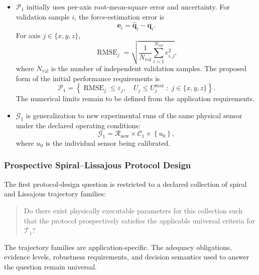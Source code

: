 \documentclass[11pt,a4paper]{article}
\begin{document}
\begin{itemize}
    \item $\mathcal{P}_1$ initially uses per-axis root-mean-square error and
    uncertainty. For validation sample $i$, the force-estimation error is
    \begin{equation}
        \mathbf{e}_i
        =
        \widehat{\mathbf{q}}_i-\mathbf{q}_i.
    \end{equation}
    For axis $j\in\{x,y,z\}$,
    \begin{equation}
        \operatorname{RMSE}_j
        =
        \sqrt{
            \frac{1}{N_{\mathrm{val}}}
            \sum_{i=1}^{N_{\mathrm{val}}}
            e_{i,j}^{2}
        },
    \end{equation}
    where $N_{\mathrm{val}}$ is the number of independent validation samples.
    The proposed form of the initial performance requirements is
    \begin{equation}
        \mathcal{P}_1
        =
        \left\{
            \operatorname{RMSE}_j \leq \varepsilon_j,
            \quad
            U_j \leq U_j^{\max}
            \;:\;
            j\in\{x,y,z\}
        \right\}.
    \end{equation}
    The numerical limits remain to be defined from the application
    requirements.

    \item $\mathcal{G}_1$ is generalization to new experimental runs of the
    same physical sensor under the declared operating conditions:
    \begin{equation}
        \mathcal{G}_1
        =
        \mathcal{R}_{\mathrm{new}}
        \times
        \mathcal{C}_1
        \times
        \left\{u_0\right\},
    \end{equation}
    where $u_0$ is the individual sensor being calibrated.
\end{itemize}

\subsubsection{Prospective Spiral--Lissajous Protocol Design}

The first protocol-design question is restricted to a declared collection of
spiral and Lissajous trajectory families:
\begin{quote}
Do there exist physically executable parameters for this collection such that
the protocol prospectively satisfies the applicable universal criteria for
$\mathcal{T}_1$?
\end{quote}
The trajectory families are application-specific. The adequacy obligations,
evidence levels, robustness requirements, and decision semantics used to
answer the question remain universal.
\end{document}
